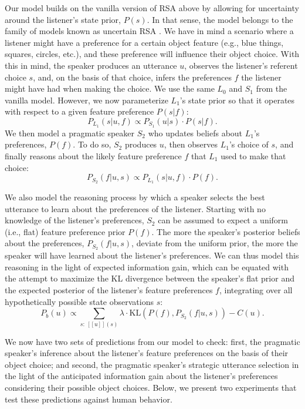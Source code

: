 \documentclass[10pt,a4paper]{article}
\begin{document}
Our model builds on the vanilla version of RSA above by allowing for uncertainty around the listener's state prior, $P(s)$. In that sense, the model belongs to the family of models known as uncertain RSA \cite{goodmanfrank2016}. We have in mind a scenario where a listener might have a preference for a certain object feature (e.g., blue things, squares, circles, etc.), and these preference will influence their object choice. With this in mind, the speaker produces an utterance $u$, observes the listener's referent choice $s$, and, on the basis of that choice, infers the preferences $f$ the listener might have had when making the choice.
We use the same $L_0$ and $S_1$ from the vanilla model. However, we now parameterize $L_1$'s state prior so that it operates with respect to a given feature preference $P(s|f)$:
$$P_{L_{1}}(s|u,f) \propto P_{S_{1}}(u|s) \cdot P(s|f).$$
We then model a pragmatic speaker $S_2$ who updates beliefs about $L_1$'s preferences, $P(f)$. To do so, $S_2$ produces $u$, then observes $L_1$'s choice of $s$, and finally reasons about the likely feature preference $f$ that $L_1$ used to make that choice:
$$P_{S_{2}}(f|u,s) \propto P_{L_{1}}(s|u,f) \cdot P(f).$$

We also model the reasoning process by which a speaker selects the best utterance to learn about the preferences of the listener.
Starting with no knowledge of the listener's preferences, $S_2$ can be assumed to expect a uniform (i.e., flat) feature preference prior $P(f)$. The more the speaker's posterior beliefs about the preferences, $P_{S_{2}}(f|u,s)$, deviate from the uniform prior, the more the speaker will have learned about the listener's preferences. 
We can thus model this reasoning in the light of expected information gain, which can be equated with the attempt to maximize the KL divergence between the speaker's flat prior and the expected posterior of the listener's feature preferences $f$, integrating over all hypothetically possible state observations $s$:
$$P_{b}(u) \propto \sum_{s:\  [\![u]\!](s)}\lambda \cdot \textrm{KL}(P(f),P_{S_{2}}(f|u,s))-C(u).$$

We now have two sets of predictions from our model to check: first, the pragmatic speaker's inference about the listener's feature preferences on the basis of their object choice; and second, the pragmatic speaker's strategic utterance selection in the light of the anticipated information gain about the listener's preferences considering their possible object choices. Below, we present two experiments that test these predictions against human behavior.
\end{document}
